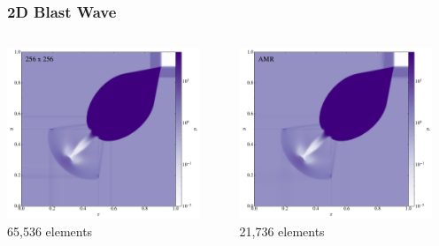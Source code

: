 \documentclass{beamer}
\begin{document}
\begin{frame}
\frametitle{2D Blast Wave}

  \begin{columns}[c]


    \begin{center}
      \includegraphics[width=0.9\textwidth]{fig.dZB2002_256x256.pdf}
      65,536 elements
    \end{center}


    \begin{center}
      \includegraphics[width=0.9\textwidth]{fig.dZB2002_032x032_AMR.pdf}
      21,736 elements
    \end{center}

  \end{columns}

\end{frame}
\end{document}
